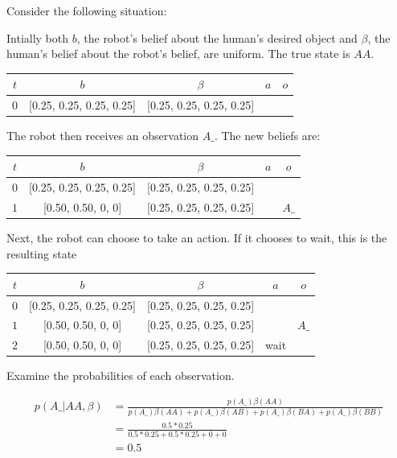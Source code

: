 \documentclass[conference]{IEEEtran}
\begin{document}
Consider the following situation: 

Intially both $b$, the robot's belief about the human's desired object and $\beta$, the human's belief about the robot's belief, are uniform. The true state is $AA$. 

\begin{center}
\begin{tabular}{|c| c| c| c | c|}
	\hline
	$t$ & $b$ & $\beta$ & $a$ & $o$ \\
	\hline
	$0$ & [0.25, 0.25, 0.25, 0.25] & [0.25, 0.25, 0.25, 0.25] & & \\
	\hline
\end{tabular}
\end{center}


The robot then receives an observation $A\_$. The new beliefs are: 

\begin{center}
\begin{tabular}{|c| c| c| c | c|}
	\hline
	$t$ & $b$ & $\beta$ & $a$ & $o$ \\
	\hline
	$0$ & [0.25, 0.25, 0.25, 0.25] & [0.25, 0.25, 0.25, 0.25] & & \\
	\hline
	$1$ & [0.50, 0.50, 0, 0] & [0.25, 0.25, 0.25, 0.25] & & $A\_$ \\
	\hline
\end{tabular}
\end{center}

Next, the robot can choose to take an action. If it chooses to wait, this is the resulting state


\begin{center}
\begin{tabular}{|c| c| c| c | c|}
	\hline
	$t$ & $b$ & $\beta$ & $a$ & $o$ \\
	\hline
	$0$ & [0.25, 0.25, 0.25, 0.25] & [0.25, 0.25, 0.25, 0.25] & & \\
	\hline
	$1$ & [0.50, 0.50, 0, 0] & [0.25, 0.25, 0.25, 0.25] & & $A\_$ \\
	\hline
	$2$ & [0.50, 0.50, 0, 0] & [0.25, 0.25, 0.25, 0.25] & wait  &  \\
	\hline
\end{tabular}
\end{center}

Examine the probabilities of each observation.

\begin{align*}
	p(A\_ | AA, \beta) &= \frac{ p(A\_)\beta(AA) }{ p(A\_)\beta(AA) + p(A\_)\beta(AB) + p(A\_)\beta(BA) + p(A\_)\beta(BB)} \\
	&= \frac{0.5 * 0.25}{0.5 * 0.25 + 0.5 * 0.25 + 0 + 0} \\
	&= 0.5
\end{align*}
\end{document}
